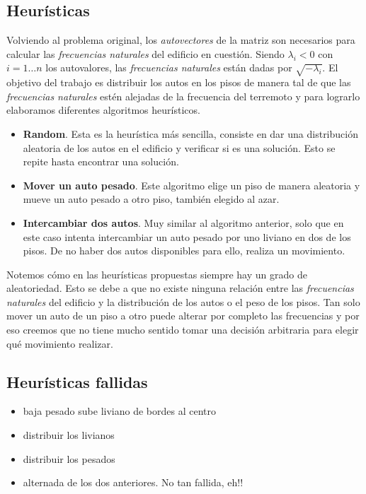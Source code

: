 \documentclass[a4paper]{article}
\begin{document}
\subsection{Heurísticas}

Volviendo al problema original, los \textit{autovectores} de la matriz son necesarios para calcular las \textit{frecuencias naturales} del edificio en cuestión. Siendo $\lambda_i < 0$ con $i = 1 \hdots n$ los autovalores, las \textit{frecuencias naturales} están dadas por $\sqrt{-\lambda_i}$. El objetivo del trabajo es distribuir los autos en los pisos de manera tal de que las \textit{frecuencias naturales} estén alejadas de la frecuencia del terremoto y para lograrlo elaboramos diferentes algoritmos heurísticos.

\begin{itemize}
  \item \textbf{Random}. Esta es la heurística más sencilla, consiste en dar una distribución aleatoria de los autos en el edificio y verificar si es una solución. Esto se repite hasta encontrar una solución.
  \item \textbf{Mover un auto pesado}. Este algoritmo elige un piso de manera aleatoria y mueve un auto pesado a otro piso, también elegido al azar.
  \item \textbf{Intercambiar dos autos}. Muy similar al algoritmo anterior, solo que en este caso intenta intercambiar un auto pesado por uno liviano en dos de los pisos. De no haber dos autos disponibles para ello, realiza un movimiento.
\end{itemize}

Notemos cómo en las heurísticas propuestas siempre hay un grado de aleatoriedad. Esto se debe a que no existe ninguna relación entre las \textit{frecuencias naturales} del edificio y la  distribución de los autos o el peso de los pisos. Tan solo mover un auto de un piso a otro puede alterar por completo las frecuencias y por eso creemos que no tiene mucho sentido tomar una decisión arbitraria para elegir qué movimiento realizar. 

\subsection{Heurísticas fallidas}

\begin{itemize}
  \item baja pesado sube liviano de bordes al centro
  \item distribuir los livianos
  \item distribuir los pesados
  \item alternada de los dos anteriores. No tan fallida, eh!!
\end{itemize}
\end{document}
